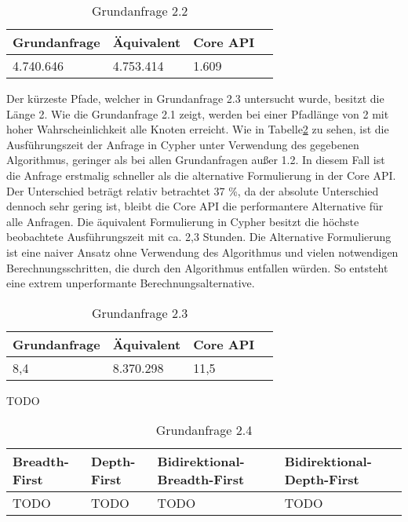 \FloatBarrier
\begin{table}[h]
	\centering
		\begin{tabular}{ |p{3cm}|p{3cm}|p{3cm}|p{3cm}|  }
			\hline
			Grundanfrage & Äquivalent&Core API\\
			\hline
			4.740.646    & 4.753.414 &  1.609\\
			\hline
		\end{tabular}
		\caption{Grundanfrage 2.2}
		\label{tab:Query2_2}
\end{table}
\FloatBarrier
Der kürzeste Pfade, welcher in Grundanfrage 2.3 untersucht wurde, besitzt die Länge 2. Wie die Grundanfrage 2.1 zeigt, werden bei einer Pfadlänge von 2 mit hoher Wahrscheinlichkeit alle Knoten erreicht. Wie in Tabelle\ref{tab:Query2_3} zu sehen, ist die Ausführungszeit der Anfrage in Cypher unter Verwendung des gegebenen Algorithmus, geringer als bei allen Grundanfragen außer 1.2. In diesem Fall ist die Anfrage erstmalig schneller als die alternative Formulierung in der Core API. Der Unterschied beträgt relativ betrachtet 37 \%, da der absolute Unterschied dennoch sehr gering ist, bleibt die Core API die performantere Alternative für alle Anfragen. \newline
Die äquivalent Formulierung in Cypher besitzt die höchste beobachtete Ausführungszeit mit ca. 2,3 Stunden. Die Alternative Formulierung ist eine naiver Ansatz ohne Verwendung des Algorithmus und vielen notwendigen Berechnungsschritten, die durch den Algorithmus entfallen würden. So entsteht eine extrem unperformante Berechnungsalternative.  
\FloatBarrier
\begin{table}[!htb]
	\centering
		\begin{tabular}{ |p{3cm}|p{3cm}|p{3cm}|p{3cm}|  }
			\hline
			Grundanfrage & Äquivalent&Core API\\
			\hline
			8,4    & 8.370.298 &  11,5\\
			\hline
		\end{tabular}
		\caption{Grundanfrage 2.3}
		\label{tab:Query2_3}
\end{table}
\FloatBarrier
TODO
\FloatBarrier
\begin{table}[!htb]
	\centering
	\begin{tabular}{ |p{3cm}|p{3cm}|p{3cm}|p{3cm}|  }
		\hline
		Breadth-First & Depth-First&Bidirektional-Breadth-First &Bidirektional-Depth-First\\
		\hline
		TODO    & TODO &  TODO  &  TODO\\
		\hline
	\end{tabular}
	\caption{Grundanfrage 2.4}
\end{table}
\FloatBarrier
